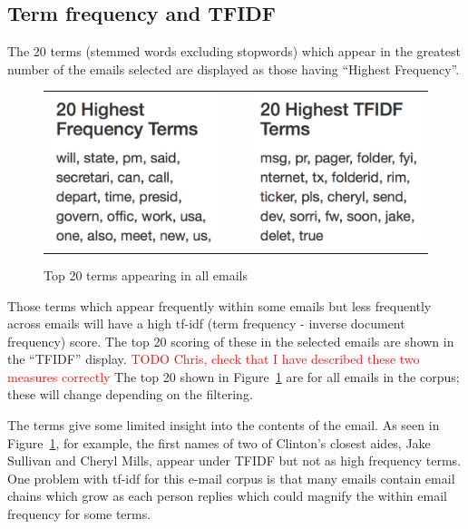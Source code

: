 \documentclass[journal]{vgtc}                %
\newcommand*{\TODO}[1]{\textcolor{red}{TODO #1}}
\begin{document}
\subsection{Term frequency and TFIDF}
\label{sect:Displays:TFIDF}
The 20 terms (stemmed words excluding stopwords) which appear in the greatest number of the emails selected are displayed as those having ``Highest Frequency''.  
\begin{figure}[h]
\begin{center}
\begin{tabular}{ccc}
\includegraphics[width=0.4\linewidth]{HighFreqAll} &
$~~~~$ &
\includegraphics[width=0.4\linewidth]{HighTFIDFAll} 
\end{tabular}
\caption{Top 20 terms appearing in all emails}
\label{fig:top20all}
\end{center}
\end{figure}
Those terms which appear frequently within some emails but less frequently across emails will have a high tf-idf (term frequency - inverse document frequency) score.  The top 20 scoring of these in the selected emails are shown in the ``TFIDF'' display. \TODO{Chris, check that I have described these two measures correctly}
The top 20 shown in Figure~\ref{fig:top20all} are for all emails in the corpus; these will change depending on the filtering.

The terms give some limited insight into the contents of the email.  As seen in Figure~\ref{fig:top20all}, for example, the first names of two of Clinton's closest aides, Jake Sullivan and Cheryl Mills,  appear under TFIDF but not  as high frequency terms.  One problem with tf-idf for this e-mail corpus is that many emails contain email chains which grow as each person replies which could magnify the within email frequency for some terms.
\end{document}

